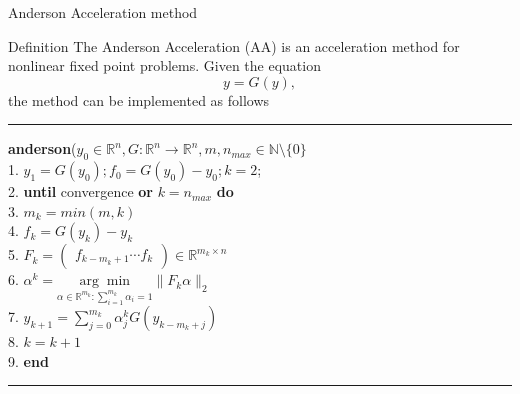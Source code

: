 \documentclass{article}
\begin{document}
\begin{section}{Anderson Acceleration method}
\begin{subsection}{Definition}
The Anderson Acceleration (AA) is an acceleration method for nonlinear fixed point problems. Given the equation
\begin{equation}
	y = G(y),
\end{equation}
the method can be implemented as follows

\noindent\rule{8cm}{0.6pt}

\noindent \textbf{anderson}($y_0\in\mathbb{R}^n,G:\mathbb{R}^n \rightarrow \mathbb{R}^n,m,n_{max}\in\mathbb{N}\setminus\{0\}$\\
1. \indent $y_1 = G(y_0); f_0 = G(y_0) - y_0; k = 2$; \\
2. \indent \textbf{until} convergence \textbf{or} $k = n_{max}$ \textbf{do} \\
3. \indent \indent \quad $m_k = min(m,k)$ \\
4. \indent \indent \quad $f_k = G(y_k) - y_k$ \\
5. \indent \indent \quad $F_k = \begin{pmatrix} f_{k-m_k+1} \cdots f_{k} \end{pmatrix} \in \mathbb{R}^{m_k\times n}$ \\
6. \indent \indent \quad $\alpha^k = \underset{\alpha \in \mathbb{R}^{m_k} : \sum_{i=1}^{m_k}\alpha_i = 1}{\arg\min} \| F_k \alpha \|_2$ \\
7. \indent \indent \quad $y_{k+1} = \sum_{j=0}^{m_k}\alpha_j^k G(y_{k-m_k+j})$ \\
8. \indent \indent \quad $k = k + 1$ \\
9. \indent \textbf{end}

\noindent\rule{8cm}{0.6pt}


\end{subsection}
\end{section}
\end{document}
